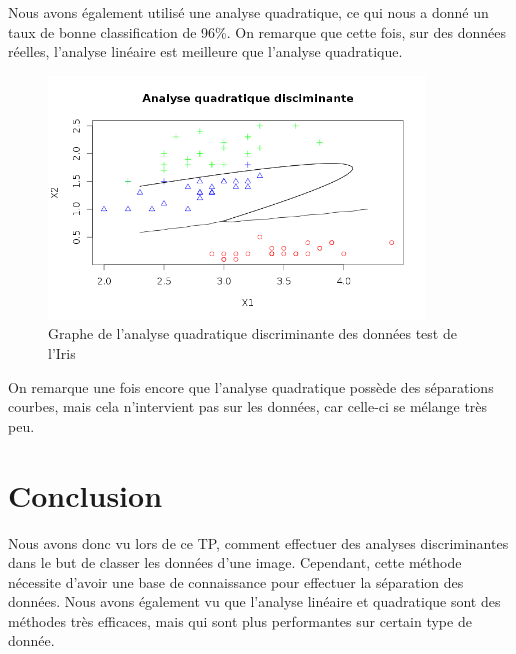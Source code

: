 \documentclass[a4paper,11pt]{article}
\begin{document}
  Nous avons également utilisé une analyse quadratique, ce qui nous a donné un taux de bonne 
  classification de 96\%. On remarque que cette fois, sur des données réelles, l'analyse linéaire
  est meilleure que l'analyse quadratique.
  
  \begin{figure}[h]
   \center
   \includegraphics[width=10cm]{iris_quadratique.png}
   \caption{Graphe de l'analyse quadratique discriminante des données test de l'Iris}
  \end{figure}
  
  On remarque une fois encore que l'analyse quadratique possède des séparations courbes,
  mais cela n'intervient pas sur les données, car celle-ci se mélange très peu.
  
  
  \section*{Conclusion}
  Nous avons donc vu lors de ce TP, comment effectuer des analyses discriminantes dans le but
  de classer les données d'une image. Cependant, cette méthode nécessite d'avoir une base de connaissance %
  pour effectuer la séparation des données. Nous avons également vu que l'analyse linéaire et quadratique
  sont des méthodes très efficaces, mais qui sont plus performantes sur certain type de donnée. 
\end{document}
